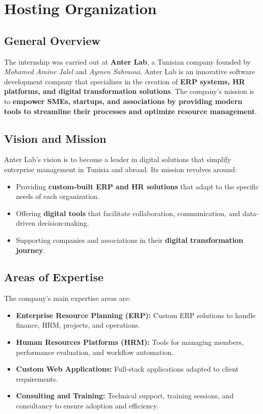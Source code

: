 \section{Hosting Organization}
\subsection{General Overview}
The internship was carried out at \textbf{Anter Lab}, a Tunisian company founded by \textit{Mohamed Amine Jalel} and \textit{Aymen Sahraoui}. Anter Lab is an innovative software development company that specializes in the creation of \textbf{ERP systems, HR platforms, and digital transformation solutions}. The company’s mission is to \textbf{empower SMEs, startups, and associations by providing modern tools to streamline their processes and optimize resource management}.

\subsection{Vision and Mission}
Anter Lab’s vision is to become a leader in digital solutions that simplify enterprise management in Tunisia and abroad.  
Its mission revolves around:
\begin{itemize}
    \item Providing \textbf{custom-built ERP and HR solutions} that adapt to the specific needs of each organization.
    \item Offering \textbf{digital tools} that facilitate collaboration, communication, and data-driven decision-making.
    \item Supporting companies and associations in their \textbf{digital transformation journey}.
\end{itemize}

\subsection{Areas of Expertise}
The company’s main expertise areas are:
\begin{itemize}
    \item \textbf{Enterprise Resource Planning (ERP):} Custom ERP solutions to handle finance, HRM, projects, and operations.
    \item \textbf{Human Resources Platforms (HRM):} Tools for managing members, performance evaluation, and workflow automation.
    \item \textbf{Custom Web Applications:} Full-stack applications adapted to client requirements.
    \item \textbf{Consulting and Training:} Technical support, training sessions, and consultancy to ensure adoption and efficiency.
\end{itemize}


